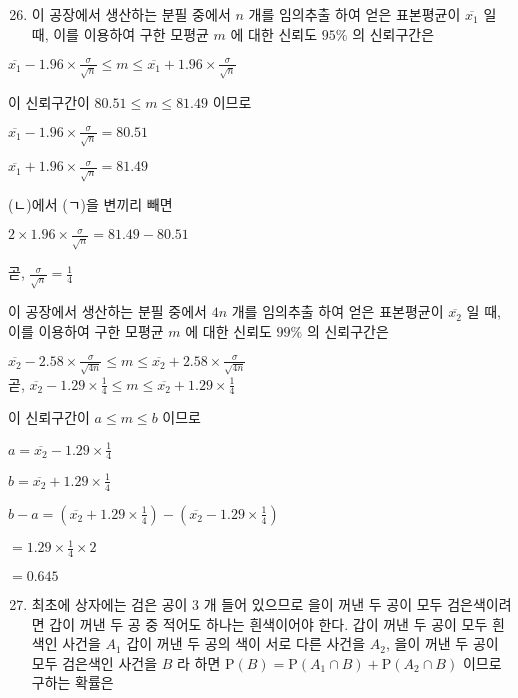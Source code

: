 \documentclass[10pt]{article}
\begin{document}
\begin{enumerate}
  \setcounter{enumi}{25}
  \item 이 공장에서 생산하는 분필 중에서 \(n\) 개를 임의추출 하여 얻은 표본평균이 \(\overline{x_{1}}\) 일 때, 이를 이용하여 구한 모평균 \(m\) 에 대한 신뢰도 \(95 \%\) 의 신뢰구간은
\end{enumerate}

\(\overline{x_{1}}-1.96 \times \frac{\sigma}{\sqrt{n}} \leq m \leq \overline{x_{1}}+1.96 \times \frac{\sigma}{\sqrt{n}}\)

이 신뢰구간이 \(80.51 \leq m \leq 81.49\) 이므로

\(\overline{x_{1}}-1.96 \times \frac{\sigma}{\sqrt{n}}=80.51\)

\(\overline{x_{1}}+1.96 \times \frac{\sigma}{\sqrt{n}}=81.49\)

(ㄴ)에서 (ㄱ)을 변끼리 빼면

\(2 \times 1.96 \times \frac{\sigma}{\sqrt{n}}=81.49-80.51\)

곧, \(\frac{\sigma}{\sqrt{n}}=\frac{1}{4}\)

이 공장에서 생산하는 분필 중에서 \(4 n\) 개를 임의추출 하여 얻은 표본평균이 \(\overline{x_{2}}\) 일 때, 이를 이용하여 구한 모평균 \(m\) 에 대한 신뢰도 \(99 \%\) 의 신뢰구간은

\(\overline{x_{2}}-2.58 \times \frac{\sigma}{\sqrt{4 n}} \leq m \leq \overline{x_{2}}+2.58 \times \frac{\sigma}{\sqrt{4 n}}\)\\
곧, \(\overline{x_{2}}-1.29 \times \frac{1}{4} \leq m \leq \overline{x_{2}}+1.29 \times \frac{1}{4}\)

이 신뢰구간이 \(a \leq m \leq b\) 이므로

\(a=\overline{x_{2}}-1.29 \times \frac{1}{4}\)

\(b=\overline{x_{2}}+1.29 \times \frac{1}{4}\)

\(b-a=\left(\overline{x_{2}}+1.29 \times \frac{1}{4}\right)-\left(\overline{x_{2}}-1.29 \times \frac{1}{4}\right)\)

\(=1.29 \times \frac{1}{4} \times 2\)

\(=0.645\)

\begin{enumerate}
  \setcounter{enumi}{26}
  \item 최초에 상자에는 검은 공이 3 개 들어 있으므로 을이 꺼낸 두 공이 모두 검은색이려면 갑이 꺼낸 두 공 중 적어도 하나는 흰색이어야 한다. 갑이 꺼낸 두 공이 모두 흰색인 사건을 \(A_{1}\) 갑이 꺼낸 두 공의 색이 서로 다른 사건을 \(A_{2}\), 을이 꺼낸 두 공이 모두 검은색인 사건을 \(B\) 라 하면 \(\mathrm{P}(B)=\mathrm{P}\left(A_{1} \cap B\right)+\mathrm{P}\left(A_{2} \cap B\right)\) 이므로 구하는 확률은
\end{enumerate}
\end{document}
